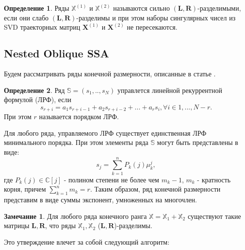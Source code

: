 \documentclass[specialist, substylefile = spbureport.rtx, subf,href,colorlinks=true, 12pt]{disser}
\theoremstyle{definition}
\newtheorem{definition}{Определение}
\newtheorem{remark}{Замечание}
\begin{document}
\begin{definition}
    Ряды $\mathbb{X}^{(1)}$ и $\mathbb{X}^{(2)}$ называются сильно $(\mathbf{L}, \mathbf{R})$-разделимыми, если они слабо $(\mathbf{L}, \mathbf{R})$-разделимы и при этом наборы сингулярных чисел из SVD траекторных матриц $\mathbf{X}^{(1)}$ и $\mathbf{X}^{(2)}$ не пересекаются.
\end{definition}


\subsection{Nested Oblique SSA}
Будем рассматривать ряды конечной размерности, описанные в статье \cite{Shlemov}.
    \begin{definition}
        Ряд $\mathbb{S} = (s_1, .., s_N)$ управлется линейной рекуррентной формулой (ЛРФ), если
        \begin{equation*}
            s_{r+i} = a_1s_{r+i - 1} + a_2s_{r+i - 2} + . . . + a_rs_i
, \forall i \in 1, . . . , N - r.
        \end{equation*}
        При этом $r$ называется порядком ЛРФ.
    \end{definition}
    Для любого ряда, управляемого ЛРФ существует единственная ЛРФ минимального порядка.
    При этом элементы ряда $\mathbb{S}$ могут быть представлены в виде:
    \begin{equation*}
        s_j =\sum^n_{k=1} P_k(j)\mu^j_k
,
    \end{equation*}
где $P_k(j) \in \mathbb{C}[j]$ - полином степени не более чем $m_k - 1$, $m_k$ - кратность корня, причем $\sum_{k = 1}^nm_k = r$.
    Таким образом, ряд конечной размерности представим в виде
суммы экспонент, умноженных на многочлен.

\begin{remark}
 Для любого ряда конечного ранга $\mathbb{X} = \mathbb{X}_1 + \mathbb{X}_2$ существуют такие матрицы $\mathbf{L}, \mathbf{R}$, что ряды $\mathbb{X}_1, \mathbb{X}_2$ ($\mathbf{L}, \mathbf{R}$)-разделимы.
\end{remark}

Это утверждение влечет за собой следующий алгоритм:
\end{document}
